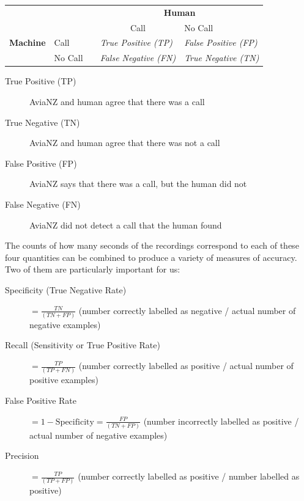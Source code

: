 \documentclass{article}
\begin{document}
\begin{center}
\begin{tabular}{lllll}
&          &  & \multicolumn{2}{c}{\textbf{Human}}   \\
\cmidrule(lr){4-5}
             &          &  & \multicolumn{1}{c}{Call}                                               & No Call                                                               \\
 \textbf{Machine}                  &\vline \hspace{0.25cm}Call     &  & \textit{True Positive (TP)}  & \textit{False Positive (FP)} \\
                  &\vline \hspace{0.25cm}No Call &  & \textit{False Negative (FN)} & \textit{True Negative (TN)}  \\
\end{tabular}
\end{center}

\begin{description}
\item[True Positive (TP)] AviaNZ and human agree that there was a call 
\item[True Negative (TN)] AviaNZ and human agree that there was not a call
\item[False Positive (FP)] AviaNZ says that there was a call, but the human did not
\item[False Negative (FN)] AviaNZ did not detect a call that the human found
\end{description}

The counts of how many seconds of the recordings correspond to each of these four quantities can be combined to produce a variety of measures of accuracy. Two of them are particularly important for us:

\begin{description}
\item[Specificity (True Negative Rate)] $= \frac{TN}{(TN + FP)}$ (number correctly labelled as negative / actual number of negative examples)
\item[Recall (Sensitivity or True Positive Rate)] $= \frac{TP}{(TP + FN)}$ (number correctly labelled as positive / actual number of positive examples) 
\item[False Positive Rate] $= 1 - \mathrm{Specificity} = \frac{FP}{(TN + FP)}$ (number incorrectly labelled as positive / actual number of negative examples)
\item[Precision] $= \frac{TP}{(TP + FP)}$ (number correctly labelled as positive / number labelled as positive)
\end{description}
\end{document}
